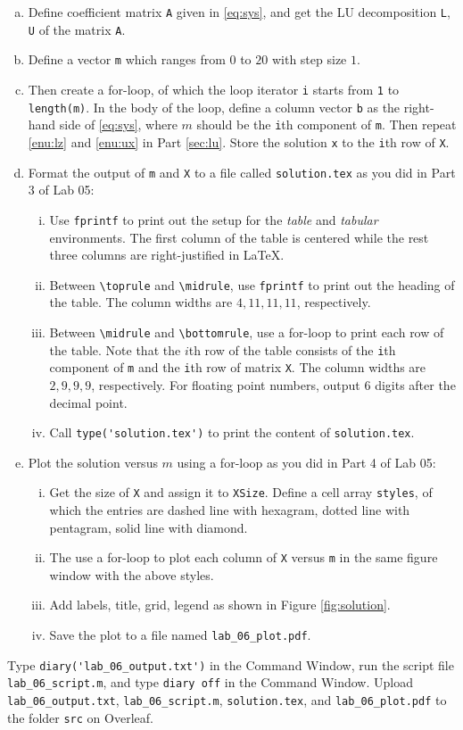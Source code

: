 \begin{enumerate}[(a)]
\item Define coefficient matrix \verb|A| given in \eqref{eq:sys}, and get the LU decomposition \verb|L|, \verb|U| of the matrix \verb|A|.
\item Define a vector \verb|m| which ranges from $0$ to $20$ with step size $1$.
\item Then create a for-loop, of which the loop iterator \verb|i| starts from \verb|1| to \verb|length(m)|. In the body of the loop, define a column vector \verb|b| as the right-hand side of \eqref{eq:sys}, where $m$ should be the \verb|i|th component of \verb|m|. Then repeat \eqref{enu:lz} and \eqref{enu:ux} in Part \ref{sec:lu}. Store the solution \verb|x| to the \verb|i|th row of \verb|X|.
\item Format the output of \verb|m| and \verb|X| to a file called \verb|solution.tex| as you did in Part 3 of Lab 05:
  \begin{enumerate}[(i)]
    \item Use \verb|fprintf| to print out the setup for the \emph{table} and \emph{tabular} environments. The first column of the table is centered while the rest three columns are right-justified in \LaTeX{}.
    \item Between \verb|\toprule| and \verb|\midrule|, use \verb|fprintf| to print out the heading of the table. The column widths are $4, 11, 11, 11$, respectively.
    \item Between \verb|\midrule| and \verb|\bottomrule|, use a for-loop to print each row of the table. Note that the $i$th row of the table consists of the \verb|i|th component of \verb|m| and the \verb|i|th row of matrix \verb|X|. The column widths are $2, 9, 9, 9$, respectively. For floating point numbers, output 6 digits after the decimal point.
    \item Call \verb|type('solution.tex')| to print the content of \verb|solution.tex|.
  \end{enumerate}
\item Plot the solution versus $m$ using a for-loop as you did in Part 4 of Lab 05:
  \begin{enumerate}[(i)]
    \item Get the size of \verb|X| and assign it to \verb|XSize|. Define a cell array \verb|styles|, of which the entries are dashed line with hexagram, dotted line with pentagram, solid line with diamond.
    \item The use a for-loop to plot each column of \verb|X| versus \verb|m| in the same figure window with the above styles.
    \item Add labels, title, grid, legend as shown in Figure \ref{fig:solution}.
    \item Save the plot to a file named \verb|lab_06_plot.pdf|.
  \end{enumerate}
\end{enumerate}
Type \verb|diary('lab_06_output.txt')| in the Command Window, run the script file \verb|lab_06_script.m|, and type \verb|diary off| in the Command Window. Upload \verb|lab_06_output.txt|, \verb|lab_06_script.m|, \verb|solution.tex|, and \verb|lab_06_plot.pdf| to the folder \verb|src| on Overleaf.

